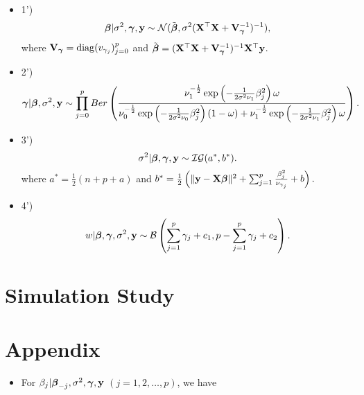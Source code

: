 \documentclass[]{book}
\providecommand{\tightlist}{%
  \setlength{\itemsep}{0pt}\setlength{\parskip}{0pt}}
\begin{document}
\begin{itemize}
\item
  1')
  \[{\boldsymbol \beta}|\sigma^2, {\boldsymbol \gamma}, {\bf y}\sim \mathcal{N}(\tilde{{\boldsymbol \beta}}, {\sigma^2}({\bf X}^{\top}{\bf X}+{\bf V}^{-1}_{\boldsymbol \gamma})^{-1}),\]
  where \({\bf V}_{\boldsymbol \gamma}={\rm diag}(v_{\gamma_j})_{j=0}^p\) and \(\tilde{{\boldsymbol \beta}} = ({\bf X}^{\top}{\bf X}+{\bf V}^{-1}_{\boldsymbol \gamma})^{-1}{\bf X}^{\top}{\bf y}\).
\item
  2')
  \[
  {\boldsymbol \gamma}|{\boldsymbol \beta}, \sigma^2, {\bf y}\sim \prod_{j=0}^p Ber\left(\frac{ \nu_1^{-\frac{1}{2}}
    \exp\left(-\frac{1}{2\sigma^2\nu_1}\beta_j^2\right)\omega}
  {  \nu_0^{-\frac{1}{2}}\exp\left(-\frac{1}{2\sigma^2\nu_0}\beta_j^2\right)\left(1-\omega\right)+
   \nu_1^{-\frac{1}{2}}\exp\left(-\frac{1}{2\sigma^2\nu_1}\beta_j^2\right)\omega}\right).
  \]
\item
  3')
  \[\sigma^2|{\boldsymbol \beta}, {\boldsymbol \gamma}, {\bf y}\sim \mathcal{IG}(a^*,b^*).\]
  where \(a^*=\frac{1}{2}(n+p+a)\) and
  \(b^* = \frac{1}{2}\left(\|{\bf y}-{\bf X}{\boldsymbol \beta}\|^2 + \sum_{j=1}^{p}\frac{\beta_j^2}{\nu_{\gamma_j}} + b\right).\)
\item
  4')
  \[w|{\boldsymbol \beta},{\boldsymbol \gamma},\sigma^2,{\bf y}\sim \mathcal{B}\left(\sum_{j=1}^p \gamma_j+c_1,p-\sum_{j=1}^p \gamma_j+c_2\right).\]
\end{itemize}

\hypertarget{simulation-study}{%
\chapter{Simulation Study}\label{simulation-study}}

\hypertarget{appendix}{%
\chapter{Appendix}\label{appendix}}

\begin{itemize}
\tightlist
\item
  For \(\beta_j|{\boldsymbol \beta}_{-j}, \sigma^2, {\boldsymbol \gamma}, {\bf y}\) \((j = 1,2, \ldots,p)\), we have
\end{itemize}
\end{document}
